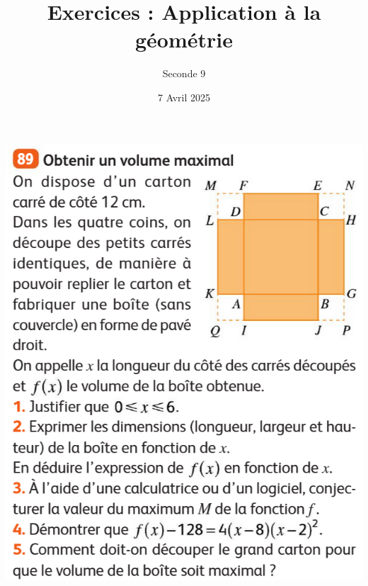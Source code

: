 \documentclass{article}
\title{Exercices : Application à la géométrie}
\date{7 Avril 2025}
\author{Seconde 9}
\begin{document}
\maketitle
\begin{center}
\includegraphics[width=\textwidth]{Exercice_1.png}
\end{center}
\end{document}
